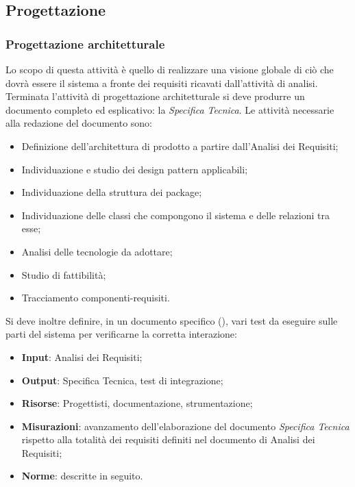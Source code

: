    \subsection{Progettazione}
	\subsubsection{Progettazione architetturale}

Lo scopo di questa attività è quello di realizzare una visione globale di ciò che dovrà essere il sistema a fronte dei requisiti ricavati dall’attività di analisi.
Terminata l’attività di progettazione architetturale si deve produrre un documento completo ed esplicativo: la \emph{Specifica Tecnica}.
Le attività necessarie alla redazione del documento sono:
\begin{itemize}
\item Definizione dell’architettura di prodotto a partire dall’Analisi dei Requisiti;
\item Individuazione e studio dei design pattern applicabili;
\item Individuazione della struttura dei package;
\item Individuazione delle classi che compongono il sistema e delle relazioni tra esse;
\item Analisi delle tecnologie da adottare;
\item Studio di fattibilità;
\item Tracciamento componenti-requisiti.
\end{itemize}
Si deve inoltre definire, in un documento specifico  (\href{run:../../Esterni/\fPianoDiQualifica}{\fEscapePianoDiQualifica}), vari
test da eseguire sulle parti del sistema per verificarne la corretta interazione:
\begin{itemize}
\item \textbf{Input}: Analisi dei Requisiti;
\item \textbf{Output}: Specifica Tecnica, test di integrazione;
\item \textbf{Risorse}: Progettisti, documentazione, strumentazione;
\item \textbf{Misurazioni}: avanzamento dell’elaborazione del documento \emph{Specifica Tecnica} rispetto alla totalità dei requisiti definiti nel documento di Analisi dei Requisiti;
\item \textbf{Norme}: descritte in seguito.
\end{itemize}

